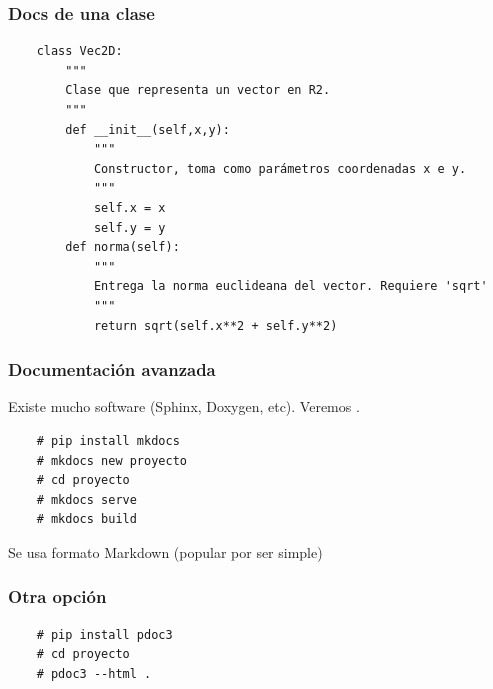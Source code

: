 \documentclass[14pt,aspectratio=169,xcolor=dvipsnames]{beamer}
\begin{document}
\begin{frame}[fragile]\frametitle{Docs de una clase}
    \begin{footnotesize}
    \begin{verbatim}
    class Vec2D:
        """
        Clase que representa un vector en R2.
        """
        def __init__(self,x,y):
            """
            Constructor, toma como parámetros coordenadas x e y.
            """
            self.x = x
            self.y = y
        def norma(self):
            """
            Entrega la norma euclideana del vector. Requiere 'sqrt'
            """
            return sqrt(self.x**2 + self.y**2)
    \end{verbatim}

    \vspace{-1cm}
    \hfill    {}
    \end{footnotesize}
\end{frame}
\begin{frame}[fragile]\frametitle{Documentación avanzada}
    Existe mucho software (Sphinx, Doxygen, etc). Veremos .

    \begin{verbatim}
    # pip install mkdocs
    # mkdocs new proyecto
    # cd proyecto
    # mkdocs serve
    # mkdocs build
    \end{verbatim} 

    \vspace{1cm}
    Se usa formato Markdown (popular por ser simple)

\end{frame}
\begin{frame}[fragile]\frametitle{Otra opción}
    \begin{verbatim}
    # pip install pdoc3
    # cd proyecto
    # pdoc3 --html .
    \end{verbatim}

\end{frame}
\end{document}
